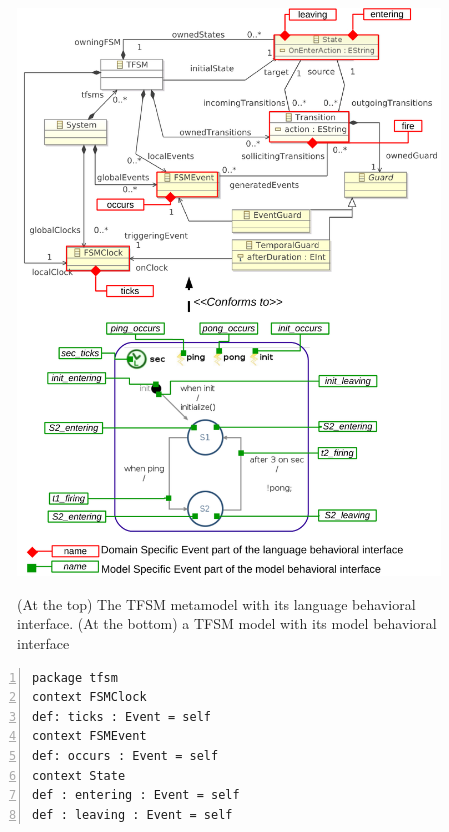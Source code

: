 \begin{figure}
	\begin{center}
		\includegraphics[width=1\textwidth]{bcool/figs/tfsmlang}
		\caption{(At the top) The TFSM metamodel with its language behavioral interface. (At the bottom)  a TFSM model with its model behavioral interface}
		\vspace{-2ex}
		\label{fig:tfsmmm}
	\end{center}
\end{figure}

\begin{lstlisting}[language=ecl,
caption={Partial \ecl specification of TFSM},
label={fig:tfsmmmecl}, 
basicstyle=\scriptsize\ttfamily, backgroundcolor=\color{LGrey}, numbers=left, xleftmargin=3pt]
package tfsm
context FSMClock
def: ticks : Event = self
context FSMEvent
def: occurs : Event = self
context State
def : entering : Event = self
def : leaving : Event = self
\end{lstlisting}


